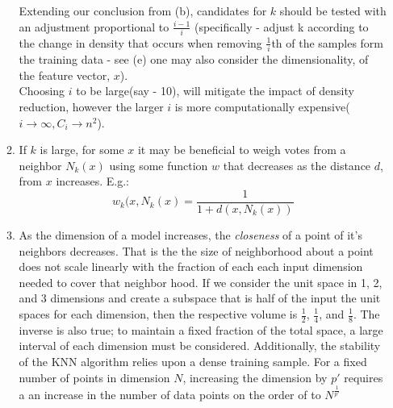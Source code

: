 \documentclass{report}
\begin{document}
\begin{enumerate}
\begin{enumerate}
			Extending our conclusion from (b), candidates for $k$ should be tested with an adjustment proportional to $\frac{i-1}{i}$ (specifically - adjust k according to the change in density that occurs when removing $\frac{1}{i}$th of the samples form the training data - see (e) one may also consider the dimensionality, of the feature vector, $x$). \\
			
			Choosing $i$ to be large(say - 10), will mitigate the impact of density reduction, however the larger $i$ is more computationally expensive($i \rightarrow \infty, C_i \rightarrow n^2$).
						
			\item If $k$ is large, for some $x$ it may be beneficial to weigh votes from a neighbor $N_k(x)$ using some function $w$ that decreases as the distance $d$, from $x$ increases. E.g.:
			\begin{equation*}
				w_{k}(x,N_k(x) = \frac{1}{1 + d(x,N_k(x) )}
			\end{equation*}
			\item As the dimension of a model increases, the \textit{closeness} of a point of it's neighbors decreases. That is the the size of neighborhood about a point does not scale linearly with the fraction of each each input dimension needed to cover that neighbor hood. If we consider the unit space in 1, 2, and 3 dimensions and create a subspace that is half of the input the unit spaces for each dimension, then the respective volume is $\frac{1}{2}$, $\frac{1}{4}$, and $\frac{1}{8}$. The inverse is also true; to maintain a fixed fraction of the total space, a large interval of each dimension must be considered. Additionally, the stability of the KNN algorithm relies upon a dense training sample. For a fixed number of points in dimension $N$, increasing the dimension by $p'$ requires a an increase in the number of data points on the order of to $N^\frac{1}{p'}$
		\end{enumerate}
		
	
\end{enumerate}
\end{document}

